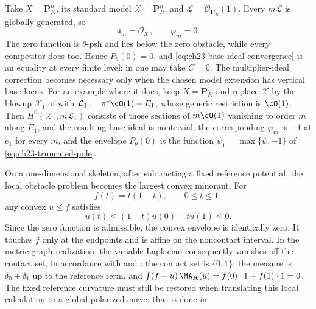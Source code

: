 \begin{example}
\label{ex:ch23-globally-generated}
Take \(X=\mathbf P^n_K\), its standard model
\(\mathcal X=\mathbf P^n_R\), and
\(\mathcal L=\mathcal O_{\mathbf P^n_R}(1)\).  Every
\(m\mathcal L\) is globally generated, so
\[
                 \mathfrak a_m=\mathcal O_{\mathcal X},
                 \qquad \varphi_m=0.
\]
The zero function is \(\theta\)-psh and lies below the zero obstacle, while
every competitor does too.  Hence \(P_\theta(0)=0\), and
\eqref{eq:ch23-base-ideal-convergence} is an equality at every finite level;
in  one may take \(C=0\).  The
multiplier-ideal correction becomes necessary only when the chosen
model extension has vertical base locus.  For an example where it does, keep
\(X=\mathbf P^1_K\) and replace \(\mathcal X\) by the blowup
\(\mathcal X_1\) of  with
\(\mathcal L_1:=\pi^*\cO(1)-E_1\), whose generic restriction is
\(\cO(1)\).  Then \(H^0(\mathcal X_1,m\mathcal L_1)\) consists of those
sections of \(m\cO(1)\) vanishing to order \(m\) along \(E_1\), and the
resulting base ideal is nontrivial; the corresponding \(\varphi_m\) is
\(-1\) at \(e_1\) for every \(m\), and the envelope \(P_\theta(0)\) is the
function \(\psi_1=\max\{\psi,-1\}\) of
\eqref{eq:ch23-truncated-pole}.
\end{example}

\begin{example}
\label{ex:ch23-convex-interval}
On a one-dimensional skeleton, after subtracting a fixed reference
potential, the local obstacle problem becomes the largest convex minorant.
For
\begin{equation}\label{eq:ch23-concave-obstacle}
                         f(t)=t(1-t),
                         \qquad 0\leq t\leq1,
\end{equation}
any convex \(u\leq f\) satisfies
\[
                  u(t)\leq(1-t)u(0)+tu(1)\leq0 .
\]
Since the zero function is admissible, the convex envelope is identically
zero.  It touches \(f\) only at the endpoints and is affine on the
noncontact interval.  In the metric-graph realization, the variable
Laplacian consequently vanishes off the contact set, in accordance with
 and
: the contact set is
\(\{0,1\}\), the measure is \(\delta_0+\delta_1\) up to the reference term,
and \(\int(f-u)\,\MA_{\mathbf R}(u)=f(0)\cdot1+f(1)\cdot1=0\).  The fixed
reference curvature must still be restored when translating this local
calculation to a global polarized curve; that is done in
.
\end{example}

